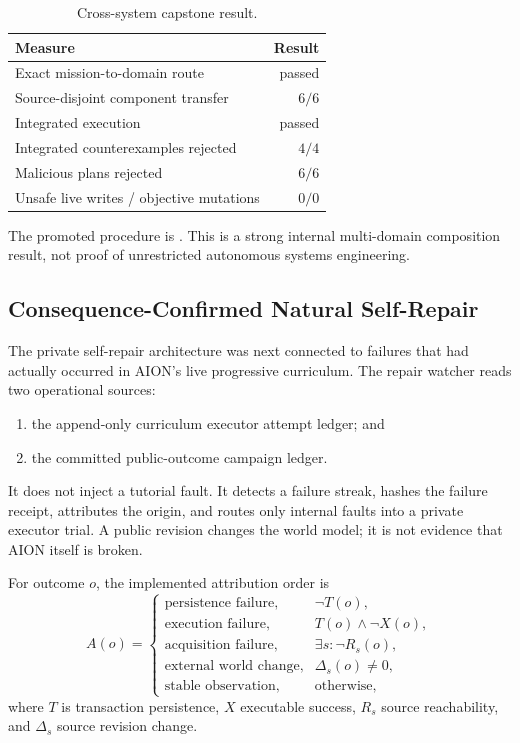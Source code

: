 \begin{table}[htbp]
\centering
\caption{Cross-system capstone result.}
\label{tab:aion-cross-system-capstone}
\begin{tabularx}{\textwidth}{@{}Xr@{}}
\toprule
Measure & Result \\
\midrule
Exact mission-to-domain route & passed \\
Source-disjoint component transfer & $6/6$ \\
Integrated execution & passed \\
Integrated counterexamples rejected & $4/4$ \\
Malicious plans rejected & $6/6$ \\
Unsafe live writes / objective mutations & $0/0$ \\
\bottomrule
\end{tabularx}
\end{table}

The promoted procedure is
.  This is a strong
internal multi-domain composition result, not proof of unrestricted autonomous
systems engineering.

\subsection{Consequence-Confirmed Natural Self-Repair}
\label{subsec:aion-consequence-confirmed-repair}

The private self-repair architecture was next connected to failures that had
actually occurred in AION's live progressive curriculum.  The repair watcher
reads two operational sources:
\begin{enumerate}
    \item the append-only curriculum executor attempt ledger; and
    \item the committed public-outcome campaign ledger.
\end{enumerate}
It does not inject a tutorial fault.  It detects a failure streak, hashes the
failure receipt, attributes the origin, and routes only internal faults into a
private executor trial.  A public revision changes the world model; it is not
evidence that AION itself is broken.

For outcome $o$, the implemented attribution order is
\begin{equation}
A(o)=
\begin{cases}
\text{persistence failure}, & \neg T(o),\\
\text{execution failure}, & T(o)\land\neg X(o),\\
\text{acquisition failure}, & \exists s:\neg R_s(o),\\
\text{external world change}, & \Delta_s(o)\neq0,\\
\text{stable observation}, & \text{otherwise},
\end{cases}
\label{eq:aion-outcome-attribution}
\end{equation}
where $T$ is transaction persistence, $X$ executable success, $R_s$ source
reachability, and $\Delta_s$ source revision change.

